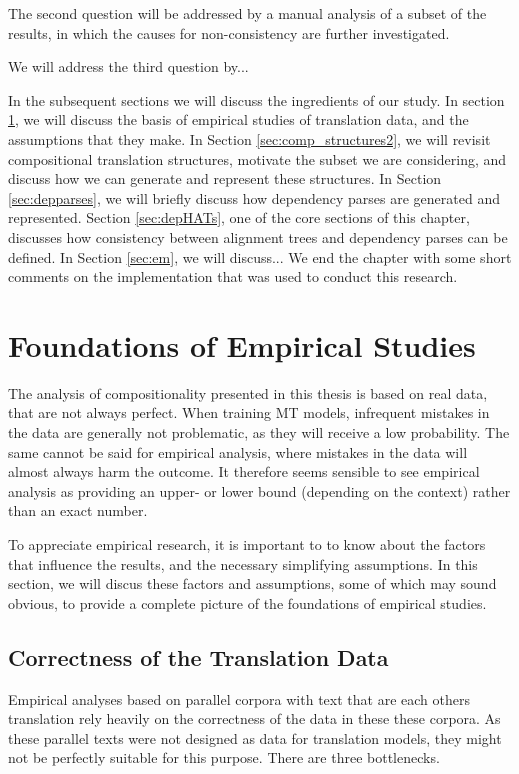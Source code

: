 The second question will be addressed by a manual analysis of a subset of the results, in which the causes for non-consistency are further investigated.

We will address the third question by...

In the subsequent sections we will discuss the ingredients of our study. In section \ref{sec:assumptions}, we will discuss the basis of empirical studies of translation data, and the assumptions that they make. In Section \ref{sec:comp_structures2}, we will revisit compositional translation structures, motivate the subset we are considering, and discuss how we can generate and represent these structures. In Section \ref{sec:depparses}, we will briefly discuss how dependency parses are generated and represented. Section \ref{sec:depHATs}, one of the core sections of this chapter, discusses how consistency between alignment trees and dependency parses can be defined. In Section \ref{sec:em}, we will discuss... We end the chapter with some short comments on the implementation that was used to conduct this research.

\section{Foundations of Empirical Studies}
\label{sec:assumptions}

The analysis of compositionality presented in this thesis is based on real data, that are not always perfect. When training MT models, infrequent mistakes in the data are generally not problematic, as they will receive a low probability. The same cannot be said for empirical analysis, where mistakes in the data will almost always harm the outcome. It therefore seems sensible to see empirical analysis as providing an upper- or lower bound (depending on the context) rather than an exact number. 

To appreciate empirical research, it is important to to know about the factors that influence the results, and the necessary simplifying assumptions. In this section, we will discus these factors and assumptions, some of which may sound obvious, to provide a complete picture of the foundations of empirical studies.

\subsection{Correctness of the Translation Data}

Empirical analyses based on parallel corpora with text that are each others translation rely heavily on the correctness of the data in these these corpora. As these parallel texts were not designed as data for translation models, they might not be perfectly suitable for this purpose. There are three bottlenecks.

